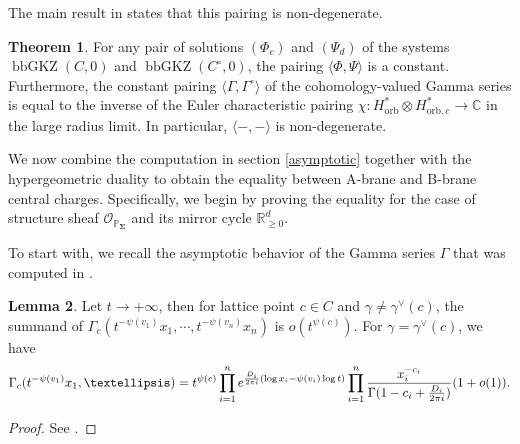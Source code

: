 \documentclass[11pt,reqno]{amsart}
\def\CC {{\mathbb C}}
\def\R {{\mathbb R}}
\def\PP {{\mathbb P}}
\theoremstyle{definition}
\newtheorem{theorem}{Theorem}[section]
\newtheorem{lemma}[theorem]{Lemma}
\numberwithin{equation}{section}
\begin{document}
\smallskip

The main result in \cite{BHanDuality} states that this pairing is non-degenerate.

\smallskip

\begin{theorem}
	For any pair of solutions $(\Phi_c)$ and $(\Psi_d)$ of the systems $\operatorname{bbGKZ}(C,0)$ and $\operatorname{bbGKZ}(C^{\circ},0)$, the pairing $\langle \Phi,\Psi\rangle$ is a constant. Furthermore, the constant pairing $\langle \Gamma,\Gamma^{\circ}\rangle$ of the cohomology-valued Gamma series is equal  to the inverse of the Euler characteristic pairing $\chi:H_{\mathrm{orb}}^*\otimes H_{\mathrm{orb},c}^*\rightarrow\CC$ in the large radius limit. In particular, $\langle-,-\rangle$ is non-degenerate.
\end{theorem}

\smallskip

We now combine the computation in section \ref{asymptotic} together with the hypergeometric duality to obtain the equality between A-brane and B-brane central charges. Specifically, we begin by proving the equality for the case of structure sheaf $\mathcal{O}_{\PP_{\mathbf{\Sigma}}}$ and its mirror cycle $\R_{\geq 0}^d$. 

\smallskip

To start with, we recall the asymptotic behavior of the Gamma series $\Gamma$ that was computed in \cite{BHanDuality}.

\smallskip

\begin{lemma}\label{asymptotics of gamma series}
	Let $t\rightarrow +\infty$, then for lattice point $c\in C$ and $\gamma\not=\gamma^{\vee}(c)$, the summand of $\Gamma_c(t^{-\psi(v_1)}x_1,\cdots,t^{-\psi(v_n)}x_n)$ is $o(t^{\psi(c)})$. For $\gamma=\gamma^{\vee}(c)$, we have
\begin{align*}
\Gamma_c(t^{-\psi(v_1)} x_1, \ldots)
=
t^{\psi(c)} \prod_{i=1}^n {\rm e}^{\frac {D_i}{2\pi{\rm i}}( \log x_i - \psi(v_i) \log t)}
\prod_{i=1}^{n}\frac {x_i^{-c_i}}{\Gamma(1-c_i +\frac {D_i}{2\pi{\rm i}} )}
(1+o(1)).
\end{align*}
\end{lemma}
\begin{proof}
	See \cite[Lemma 3.10]{BHanDuality}.
\end{proof}

\smallskip
\end{document}
